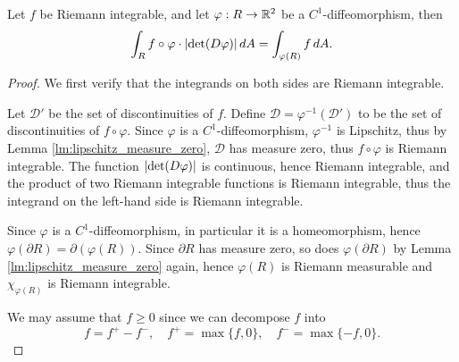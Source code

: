 \begin{thm}
    Let $f$ be Riemann integrable, and let $\varphi: R \to {\mathbb R}^2$ be a $C^1$-diffeomorphism, then
    \[
    \int_R f \circ \varphi \cdot {\left| \det (D\varphi) \right|} \, dA = \int_{\varphi(R)} f \, dA.
    \]
    \begin{proof}
        We first verify that the integrands on both sides are Riemann integrable. 
        
        Let $\mathcal D'$ be the set of discontinuities of $f$. Define $\mathcal D = \varphi^{-1}(\mathcal D')$ to be the set of discontinuities of $f \circ \varphi$. Since $\varphi$ is a $C^1$-diffeomorphism, $\varphi^{-1}$ is Lipschitz, thus by Lemma \ref{lm:lipschitz_measure_zero}, $\mathcal D$ has measure zero, thus $f \circ \varphi$ is Riemann integrable. The function ${\left| \det (D\varphi) \right|}$ is continuous, hence Riemann integrable, and the product of two Riemann integrable functions is Riemann integrable, thus the integrand on the left-hand side is Riemann integrable.

        Since $\varphi$ is a $C^1$-diffeomorphism, in particular it is a homeomorphism, hence $\varphi(\partial R) = \partial (\varphi(R))$. Since $\partial R$ has measure zero, so does $\varphi(\partial R)$ by Lemma \ref{lm:lipschitz_measure_zero} again, hence $\varphi(R)$ is Riemann measurable and $\chi_{\varphi(R)}$ is Riemann integrable. 

        We may assume that $f \geq 0$ since we can decompose $f$ into
        \[
        f = f^+ - f^-, \quad f^+ = \max\{f, 0\}, \quad f^- = \max\{-f, 0\}.
        \]

    \end{proof}
\end{thm}